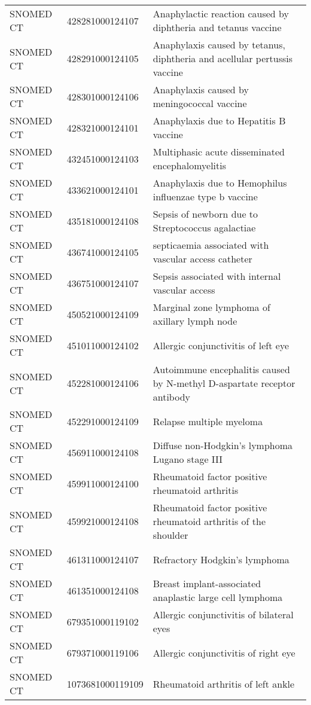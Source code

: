 \begin{longtable}{p{}p{}p{}}
  SNOMED CT & 428281000124107 & Anaphylactic reaction caused by diphtheria and tetanus vaccine \\ 
  SNOMED CT & 428291000124105 & Anaphylaxis caused by tetanus, diphtheria and acellular pertussis vaccine \\ 
  SNOMED CT & 428301000124106 & Anaphylaxis caused by meningococcal vaccine \\ 
  SNOMED CT & 428321000124101 & Anaphylaxis due to Hepatitis B vaccine \\ 
  SNOMED CT & 432451000124103 & Multiphasic acute disseminated encephalomyelitis \\ 
  SNOMED CT & 433621000124101 & Anaphylaxis due to Hemophilus influenzae type b vaccine \\ 
  SNOMED CT & 435181000124108 & Sepsis of newborn due to Streptococcus agalactiae \\ 
  SNOMED CT & 436741000124105 & septicaemia associated with vascular access catheter \\ 
  SNOMED CT & 436751000124107 & Sepsis associated with internal vascular access \\ 
  SNOMED CT & 450521000124109 & Marginal zone lymphoma of axillary lymph node \\ 
  SNOMED CT & 451011000124102 & Allergic conjunctivitis of left eye \\ 
  SNOMED CT & 452281000124106 & Autoimmune encephalitis caused by N-methyl D-aspartate receptor antibody \\ 
  SNOMED CT & 452291000124109 & Relapse multiple myeloma \\ 
  SNOMED CT & 456911000124108 & Diffuse non-Hodgkin's lymphoma Lugano stage III \\ 
  SNOMED CT & 459911000124100 & Rheumatoid factor positive rheumatoid arthritis \\ 
  SNOMED CT & 459921000124108 & Rheumatoid factor positive rheumatoid arthritis of the shoulder \\ 
  SNOMED CT & 461311000124107 & Refractory Hodgkin's lymphoma \\ 
  SNOMED CT & 461351000124108 & Breast implant-associated anaplastic large cell lymphoma \\ 
  SNOMED CT & 679351000119102 & Allergic conjunctivitis of bilateral eyes \\ 
  SNOMED CT & 679371000119106 & Allergic conjunctivitis of right eye \\ 
  SNOMED CT & 1073681000119109 & Rheumatoid arthritis of left ankle \\ 

\end{longtable}
